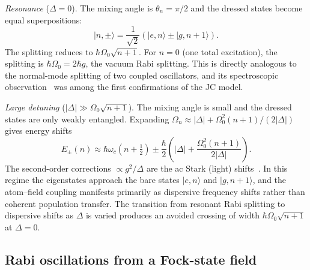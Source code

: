 \documentclass{iopjournal}
\begin{document}
\textit{Resonance} ($\Delta = 0$). The mixing angle is $\theta_n = \pi/2$ and the dressed states become equal superpositions:
\begin{equation}
|n, \pm\rangle = \frac{1}{\sqrt{2}}\left(|e,n\rangle \pm |g,n{+}1\rangle\right).
\end{equation}
The splitting reduces to $\hbar\Omega_0\sqrt{n+1}$. For $n = 0$ (one total excitation), the splitting is $\hbar\Omega_0 = 2\hbar g$, the vacuum Rabi splitting. This is directly analogous to the normal-mode splitting of two coupled oscillators, and its spectroscopic observation~\cite{thompson1992} was among the first confirmations of the JC model.

\textit{Large detuning} ($|\Delta| \gg \Omega_0\sqrt{n+1}$). The mixing angle is small and the dressed states are only weakly entangled. Expanding $\Omega_n \approx |\Delta| + \Omega_0^2(n+1)/(2|\Delta|)$ gives energy shifts
\begin{equation}
E_\pm(n) \approx \hbar\omega_c\left(n + \tfrac{1}{2}\right) \pm \frac{\hbar}{2}\left(|\Delta| + \frac{\Omega_0^2(n+1)}{2|\Delta|}\right).
\end{equation}
The second-order corrections $\propto g^2/\Delta$ are the ac Stark (light) shifts~\cite{haroche2006}. In this regime the eigenstates approach the bare states $|e,n\rangle$ and $|g,n{+}1\rangle$, and the atom--field coupling manifests primarily as dispersive frequency shifts rather than coherent population transfer. The transition from resonant Rabi splitting to dispersive shifts as $\Delta$ is varied produces an avoided crossing of width $\hbar\Omega_0\sqrt{n+1}$ at $\Delta = 0$.


\subsection{Rabi oscillations from a Fock-state field}
\label{sec:rabi_fock}
\end{document}
